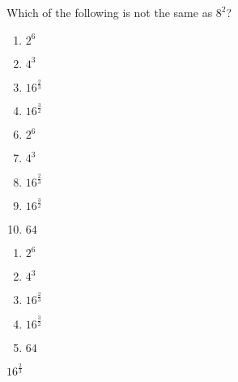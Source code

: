 



 Which of the following is not the same as $8^{2}$?


\ifsat
	\begin{enumerate}[label=\Alph*)]
		\item   $2^6$
		\item  $4^3$
		\item $16^{\frac{2}{3}}$%
		\item $16^\frac{3}{2}$
	\end{enumerate}
\else
\fi

\ifacteven
	\begin{enumerate}[label=\textbf{\Alph*.},itemsep=\fill,align=left]
		\setcounter{enumii}{5}
		\item   $2^6$
		\item  $4^3$
		\item $16^{\frac{2}{3}}$%
		\addtocounter{enumii}{1}
		\item $16^\frac{3}{2}$
		\item  $64$
	\end{enumerate}
\else
\fi

\ifactodd
	\begin{enumerate}[label=\textbf{\Alph*.},itemsep=\fill,align=left]
		\item   $2^6$
		\item  $4^3$
		\item $16^{\frac{2}{3}}$%
		\item $16^\frac{3}{2}$
		\item  $64$
	\end{enumerate}
\else
\fi

\ifgridin
 $16^{\frac{2}{3}}$%
		
\else
\fi

